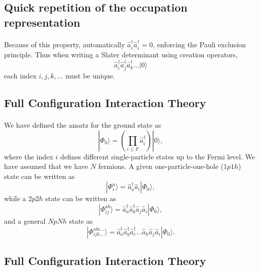 \documentclass[%
twoside,                 %
final,                   %
10pt]{article}
\begin{document}
\subsection*{Quick repetition  of the occupation representation}

\paragraph{}
Because of this property, automatically $\hat{a}^\dagger_i \hat{a}^\dagger_i = 0$, 
enforcing the Pauli exclusion principle.  Thus when writing a Slater determinant 
using creation operators, 
\[
\hat{a}^\dagger_i \hat{a}^\dagger_j \hat{a}^\dagger_k \ldots |0 \rangle
\]
each index $i,j,k, \ldots$ must be unique.




\subsection*{Full Configuration Interaction Theory}

\paragraph{}
We have defined the ansatz for the ground state as 
\[
|\Phi_0\rangle = \left(\prod_{i\le F}\hat{a}_{i}^{\dagger}\right)|0\rangle,
\]
where the index $i$ defines different single-particle states up to the Fermi level. We have assumed that we have $N$ fermions. 
A given one-particle-one-hole ($1p1h$) state can be written as
\[
|\Phi_i^a\rangle = \hat{a}_{a}^{\dagger}\hat{a}_i|\Phi_0\rangle,
\]
while a $2p2h$ state can be written as
\[
|\Phi_{ij}^{ab}\rangle = \hat{a}_{a}^{\dagger}\hat{a}_{b}^{\dagger}\hat{a}_j\hat{a}_i|\Phi_0\rangle,
\]
and a general $NpNh$ state as 
\[
|\Phi_{ijk\dots}^{abc\dots}\rangle = \hat{a}_{a}^{\dagger}\hat{a}_{b}^{\dagger}\hat{a}_{c}^{\dagger}\dots\hat{a}_k\hat{a}_j\hat{a}_i|\Phi_0\rangle.
\]



\subsection*{Full Configuration Interaction Theory}

\end{document}
